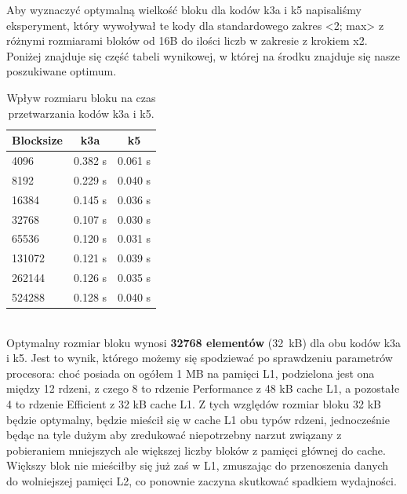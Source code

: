 \documentclass[10pt]{article}
\begin{document}
Aby wyznaczyć optymalną wielkość bloku dla kodów k3a i k5 napisaliśmy eksperyment,
który wywoływał te kody dla standardowego zakres <2; max> z różnymi rozmiarami bloków
od 16B do ilości liczb w zakresie z krokiem x2. Poniżej znajduje się część tabeli wynikowej,
w której na środku znajduje się nasze poszukiwane optimum.
\\
\begin{table}[h!]
\centering
\begingroup
\begin{tabular}{|l|c|c|}
\hline
\textbf{Blocksize} & \textbf{k3a} & \textbf{k5} \\
\hline

4096 & 0.382 s & 0.061 s \\
\hline
8192 & 0.229 s & 0.040 s \\
\hline
16384 & 0.145 s & 0.036 s \\
\hline
32768 & 0.107 s & 0.030 s \\
\hline
65536 & 0.120 s & 0.031 s \\
\hline
131072 & 0.121 s & 0.039 s \\
\hline
262144 & 0.126 s & 0.035 s \\
\hline
524288 & 0.128 s & 0.040 s \\
\hline

\end{tabular}%
\endgroup
\caption{Wpływ rozmiaru bloku na czas przetwarzania kodów k3a i k5.}
\end{table}
\\
Optymalny rozmiar bloku wynosi \textbf{32768 elementów} (32~kB) dla obu kodów 
k3a i k5. Jest to wynik, którego możemy się spodziewać po sprawdzeniu parametrów
procesora: choć posiada on ogółem 1 MB na pamięci L1, podzielona jest ona między 12 rdzeni,
z czego 8 to rdzenie Performance z 48 kB cache L1, a pozostałe 4 to rdzenie Efficient z 32 kB
cache L1. Z tych względów rozmiar bloku 32 kB będzie optymalny, będzie mieścił się w cache L1 
obu typów rdzeni, jednocześnie będąc na tyle dużym aby zredukować niepotrzebny narzut związany z pobieraniem
mniejszych ale większej liczby bloków z pamięci głównej do cache. Większy blok nie mieściłby się już zaś w L1, zmuszając
do przenoszenia danych do wolniejszej pamięci L2, co ponownie zaczyna skutkować spadkiem wydajności.
\newpage
\end{document}
